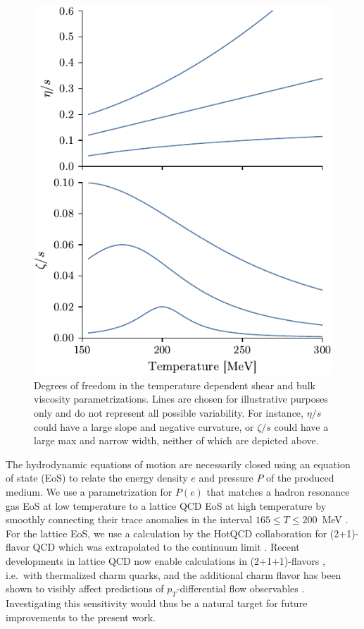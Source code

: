 \documentclass[aps,prc,reprint,amsmath,nofootinbib]{revtex4-1}
\begin{document}
\begin{figure}[t]
  \includegraphics{viscosity_dof}
  \caption{Degrees of freedom in the temperature dependent shear and bulk viscosity parametrizations. Lines are chosen for illustrative purposes only and do not represent all possible variability. For instance, $\eta/s$ could have a large slope and negative curvature, or $\zeta/s$ could have a large max and narrow width, neither of which are depicted above.}
  \label{fig:viscosity_dof}
\end{figure}

The hydrodynamic equations of motion are necessarily closed using an equation of state (EoS) to relate the energy density $e$ and pressure $P$ of the produced medium.
We use a parametrization for $P(e)$ that matches a hadron resonance gas EoS at low temperature to a lattice QCD EoS at high temperature by smoothly connecting their trace anomalies in the interval
$165 \le T \le 200$~MeV \cite{Bernhard:2018hnz}.
For the lattice EoS, we use a calculation by the HotQCD collaboration for (2+1)-flavor QCD which was extrapolated to the continuum limit \cite{Bazavov:2014pvz}. Recent developments in lattice QCD now enable calculations in (2+1+1)-flavors \cite{Borsanyi:2016ksw}, i.e.\ with thermalized charm quarks, and the additional charm flavor has been shown to visibly affect predictions of $p_T$-differential flow observables \cite{Noronha-Hostler:2018zxc}.
Investigating this sensitivity would thus be a natural target for future improvements to the present work.
\end{document}
